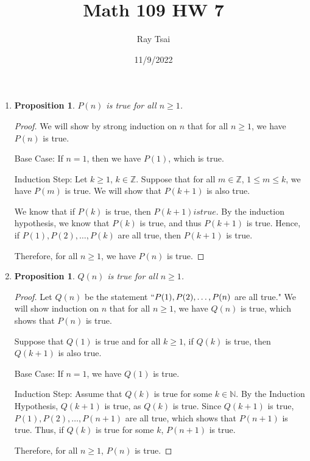 \documentclass{article}
\title{Math 109 HW 7}
\author{Ray Tsai}
\date{11/9/2022}
\newtheorem{prop}[thm]{Proposition}
\begin{document}
 

\maketitle 

\begin{enumerate}
\item 
\begin{prop}
    $P(n)$ is true for all $n \geq 1$.
\end{prop}
\begin{proof}
    We will show by strong induction on $n$ that for all $n \geq 1$, we have $P(n)$ is true.

    Base Case: If $n = 1$, then we have $P(1)$, which is true. 

    Induction Step: Let $k \geq 1$, $k \in \mathbb{Z}$. Suppose that for all $m \in \mathbb{Z}$, $1 \leq m \leq k$, we have $P(m)$ is true. We will show that $P(k + 1)$ is also true.

    We know that if $P(k)$ is true, then $P(k + 1) is true$. By the induction hypothesis, we know that $P(k)$ is true, and thus $P(k + 1)$ is true. Hence, if $P(1), P(2), \ldots , P(k)$ are all true, then $P(k + 1)$ is true.

    Therefore, for all $n \geq 1$, we have $P(n)$ is true.
\end{proof}

\item 
\begin{prop}
    $Q(n)$ is true for all $n \geq 1$.
\end{prop}
\begin{proof}
    Let $Q(n)$ be the statement $``P(1), P(2), \ldots , P(n)$ are all true."
    We will show induction on $n$ that for all $n \geq 1$, we have $Q(n)$ is true, which shows that $P(n)$ is true.

    Suppose that $Q(1)$ is true and for all $k \geq 1$, if $Q(k)$ is true, then $Q(k + 1)$ is also true.

    Base Case: If $n = 1$, we have $Q(1)$ is true.

    Induction Step: Assume that $Q(k)$ is true for some $k \in \mathbb{N}$. By the Induction Hypothesis, $Q(k + 1)$ is true, as $Q(k)$ is true. Since $Q(k + 1)$ is true, $P(1), P(2), \ldots , P(n + 1)$ are all true, which shows that $P(n + 1)$ is true. Thus, if $Q(k)$ is true for some $k$, $P(n + 1)$ is true.

    Therefore, for all $n \geq 1$, $P(n)$ is true.
\end{proof}


\end{enumerate}
\end{document}
